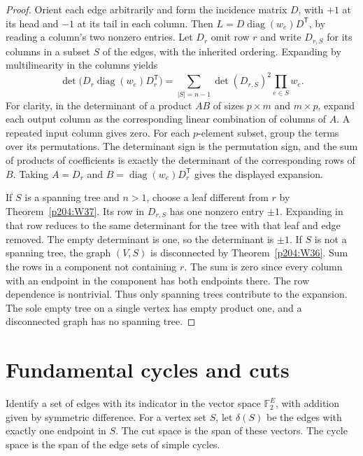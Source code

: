 \documentclass[11pt,oneside,openany]{book}
\theoremstyle{plain}
\theoremstyle{definition}
\theoremstyle{remark}
\begin{document}
\begin{proof}
Orient each edge arbitrarily and form the incidence matrix \(D\), with
\(+1\) at its head and \(-1\) at its tail in each column. Then
\(L=D\operatorname{diag}(w_e)D^{\mathsf T}\), by reading a column's two
nonzero entries. Let \(D_r\) omit row \(r\) and write \(D_{r,S}\) for
its columns in a subset \(S\) of the edges, with the inherited ordering.
Expanding by multilinearity in the columns yields
\[
 \det\bigl(D_r\operatorname{diag}(w_e)D_r^{\mathsf T}\bigr)
   =\sum_{|S|=n-1}\det(D_{r,S})^2\prod_{e\in S} w_e .
\]
For clarity, in the determinant of a product \(AB\) of sizes \(p\times m\)
and \(m\times p\), expand each output column as the corresponding linear
combination of columns of \(A\). A repeated input column gives zero.
For each \(p\)-element subset, group the terms over its permutations.
The determinant sign is the permutation sign, and the sum of products
of coefficients is exactly the determinant of the corresponding rows
of \(B\). Taking \(A=D_r\) and \(B=\operatorname{diag}(w_e)D_r^{\mathsf T}\)
gives the displayed expansion.

If \(S\) is a spanning tree and \(n>1\), choose a leaf different from
\(r\) by Theorem~\ref{p204:W37}. Its row in \(D_{r,S}\) has one nonzero
entry \(\pm1\). Expanding in that row reduces to the same determinant
for the tree with that leaf and edge removed. The empty determinant
is one, so the determinant is \(\pm1\). If \(S\) is not a spanning
tree, the graph \((V,S)\) is disconnected by Theorem~\ref{p204:W36}.
Sum the rows in a component not containing \(r\). The sum is zero
since every column with an endpoint in the component has both
endpoints there. The row dependence is nontrivial. Thus only spanning
trees contribute to the expansion. The sole empty tree on a single
vertex has empty product one, and a disconnected graph has no spanning
tree.
\end{proof}

\section{Fundamental cycles and cuts}

Identify a set of edges with its indicator in the vector space
\(\mathbb{F}_2^E\), with addition given by symmetric difference. For a
vertex set \(S\), let \(\delta(S)\) be the edges with exactly one
endpoint in \(S\). The cut space is the span of these vectors. The cycle
space is the span of the edge sets of simple cycles.
\end{document}
